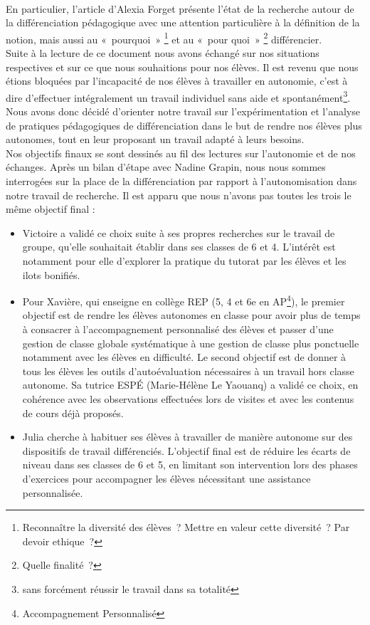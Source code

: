 \paragraph{}En particulier, l'article d'Alexia Forget\cite{cnesco_etat_lieux} présente l'état de la recherche autour de la différenciation pédagogique avec une attention particulière à la définition de la notion, mais aussi au « pourquoi » \footnote{Reconnaître la diversité des élèves ? Mettre en valeur cette diversité ? Par devoir ethique ?} et au « pour quoi » \footnote{Quelle finalité ?} différencier.\\
Suite à la lecture de ce document nous avons échangé sur nos situations respectives et sur ce que nous souhaitions pour nos élèves. Il est revenu que nous étions bloquées par l'incapacité de nos élèves à travailler en autonomie, c'est à dire d'effectuer intégralement un travail individuel sans aide et spontanément\footnote{sans forcément réussir le travail dans sa totalité}. Nous avons donc décidé d'orienter notre travail sur l'expérimentation et l'analyse de pratiques pédagogiques de différenciation dans le but de rendre nos élèves plus autonomes, tout en leur proposant un travail adapté à leurs besoins.\\
Nos objectifs finaux se sont dessinés au fil des lectures sur l'autonomie\cite{Meirieu_autonomie}\cite{ilots_bonifies} et de nos échanges. Après un bilan d'étape avec Nadine Grapin, nous nous sommes interrogées sur la place de la différenciation par rapport à l’autonomisation dans notre travail de recherche. Il est apparu que nous n'avons pas toutes les trois le même objectif final :
\begin{itemize}
	\item Victoire a validé ce choix suite à ses propres recherches sur le travail de groupe, qu’elle souhaitait établir dans ses classes de 6 et 4. L’intérêt est notamment pour elle d’explorer la pratique du tutorat par les élèves et les ilots bonifiés.
	\item {} Pour Xavière, qui enseigne en collège REP (5, 4 et 6{e} en AP\footnote{Accompagnement Personnalisé}),  le premier objectif est de rendre les élèves autonomes en classe pour avoir plus de temps à consacrer à l’accompagnement personnalisé des élèves et passer d’une gestion de classe globale systématique à une gestion de classe plus ponctuelle notamment avec les élèves en difficulté. Le second objectif est de donner à tous les élèves les outils d’autoévaluation nécessaires à un travail hors classe autonome. Sa tutrice ESPÉ (Marie-Hélène Le Yaouanq) a validé ce choix, en cohérence avec les observations effectuées lors de visites et avec les contenus de cours déjà proposés.
	\item  Julia cherche à habituer ses élèves à travailler de manière autonome sur des dispositifs de travail différenciés. L'objectif final est de réduire les écarts de niveau dans ses classes de 6 et 5, en limitant son intervention lors des phases d’exercices pour accompagner les élèves nécessitant une assistance personnalisée.
\end{itemize}

